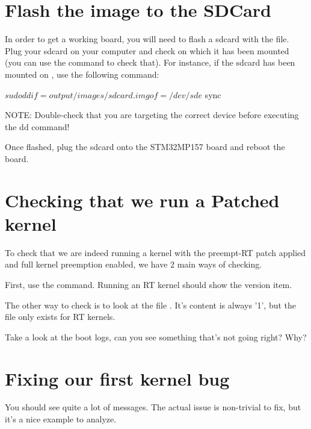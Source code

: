 \section{Flash the image to the SDCard}

In order to get a working board, you will need to flash a sdcard with the
 file. Plug your sdcard on your computer and
check on which  it has been mounted (you can use the 
command to check that). For instance, if the sdcard has been mounted on
, use the following command:

\begin{bashinput}
$ sudo dd if=output/images/sdcard.img of=/dev/sde
$ sync
\end{bashinput}

NOTE: Double-check that you are targeting the correct device before executing
the dd command!

Once flashed, plug the sdcard onto the STM32MP157 board and reboot the board.

\section{Checking that we run a Patched kernel}

To check that we are indeed running a kernel with the preempt-RT patch applied and
full kernel preemption enabled, we have 2 main ways of checking.

First, use the  command. Running an RT kernel should show the  version item.

The other way to check is to look at the file . It's content is always '1', but the file only exists for RT kernels.

Take a look at the boot logs, can you see something that's not going right? Why?

\section{Fixing our first kernel bug}

You should see quite a lot of  messages. The
actual issue is non-trivial to fix, but it's a nice example to analyze.

